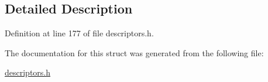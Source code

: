 \subsection{Detailed Description}


Definition at line 177 of file descriptors.\+h.



The documentation for this struct was generated from the following file\+:\begin{DoxyCompactItemize}
\item 
\hyperlink{descriptors_8h}{descriptors.\+h}\end{DoxyCompactItemize}
